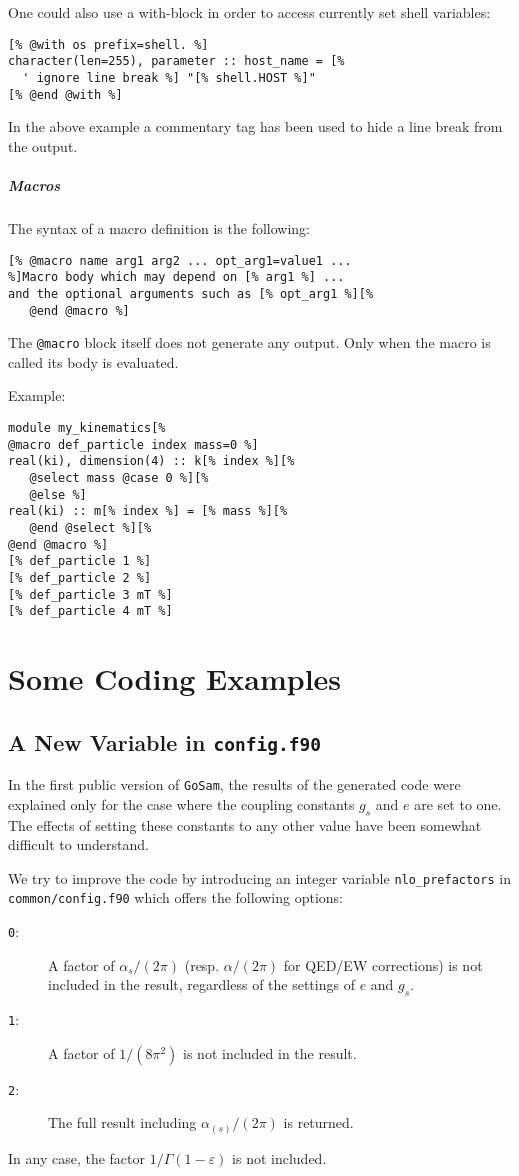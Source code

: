 \documentclass[11pt,a4paper]{refrep}
\newcommand{\golem}{{\tt GoSam}\xspace}
\begin{document}
One could also use a with-block in order to access currently set
shell variables:
\begin{lstlisting}
[% @with os prefix=shell. %]
character(len=255), parameter :: host_name = [%
  ' ignore line break %] "[% shell.HOST %]"
[% @end @with %]
\end{lstlisting}
In the above example a commentary tag has been used to hide a
line break from the output.

\paragraph{Macros}
The syntax of a macro definition is the following:
\begin{lstlisting}[language=gosamt]
[% @macro name arg1 arg2 ... opt_arg1=value1 ...
%]Macro body which may depend on [% arg1 %] ...
and the optional arguments such as [% opt_arg1 %][%
   @end @macro %]
\end{lstlisting}

\attention{} The \texttt{@macro} block itself does not generate
any output. Only when the macro is called its body is evaluated.

Example:
\begin{lstlisting}
module my_kinematics[%
@macro def_particle index mass=0 %]
real(ki), dimension(4) :: k[% index %][%
   @select mass @case 0 %][%
   @else %]
real(ki) :: m[% index %] = [% mass %][%
   @end @select %][%
@end @macro %]
[% def_particle 1 %]
[% def_particle 2 %]
[% def_particle 3 mT %]
[% def_particle 4 mT %]
\end{lstlisting}

\chapter{Some Coding Examples}

\section{A New Variable in \texttt{config.f90}}
In the first public version of \golem{}, the results of the generated code
 were explained only for the case where the coupling constants
$g_s$ and $e$ are set to one.
The effects of setting these constants to any other value
have been somewhat difficult to understand.

We try to improve the code by introducing an integer variable
\texttt{nlo\_prefactors} in \texttt{common/config.f90} which
offers the following options:
\begin{description}
\item[\texttt{0}:] A factor of $\alpha_s/(2\pi)$ (resp. $\alpha/(2\pi)$
for QED/EW corrections) is not included in the result, regardless of the
settings of $e$ and $g_s$.
\item[\texttt{1}:] A factor of $1/(8\pi^2)$ is not included in the result.
\item[\texttt{2}:] The full result including $\alpha_{(s)}/(2\pi)$ is
returned.
\end{description}
In any case, the factor $1/\Gamma(1-\varepsilon)$ is not included.
\end{document}

